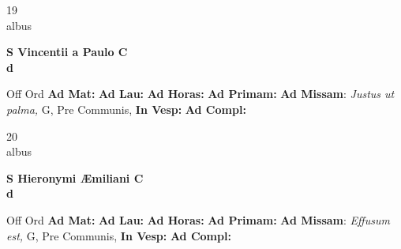 \documentclass[10pt, openany]{book}
\begin{document}
    \begin{center}
        \begin{minipage}{3.5in}
            \vspace{2em}
            \begin{minipage}{0.5in}
                {\Huge 19} \\
                {\normalsize albus}
            \end{minipage}
            \begin{minipage}{3.0in}
                \textbf{ \large S Vincentii a Paulo C \\
                \textnormal{\normalsize d}}

            \end{minipage}
            \begin{justify}Off Ord
                \textbf{Ad Mat: }
                \textbf{Ad Lau: }
                \textbf{Ad Horas: }
                \textbf{Ad Primam: }\textbf{Ad Missam}: \textit{Justus ut palma,} G, Pre Communis, 
                \textbf{In Vesp: }
                \textbf{Ad Compl: }
            \end{justify}
        \end{minipage}
    \end{center}

    \begin{center}
        \begin{minipage}{3.5in}
            \vspace{2em}
            \begin{minipage}{0.5in}
                {\Huge 20} \\
                {\normalsize albus}
            \end{minipage}
            \begin{minipage}{3.0in}
                \textbf{ \large S Hieronymi Æmiliani C \\
                \textnormal{\normalsize d}}

            \end{minipage}
            \begin{justify}Off Ord
                \textbf{Ad Mat: }
                \textbf{Ad Lau: }
                \textbf{Ad Horas: }
                \textbf{Ad Primam: }\textbf{Ad Missam}: \textit{Effusum est,} G, Pre Communis, 
                \textbf{In Vesp: }
                \textbf{Ad Compl: }
            \end{justify}
        \end{minipage}
    \end{center}
\end{document}
